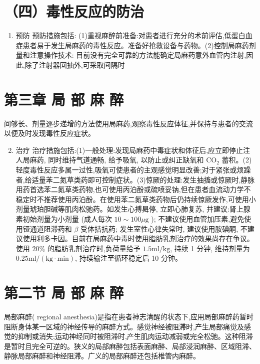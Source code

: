 \documentclass[10pt]{article}
\begin{document}
\section*{（四）毒性反应的防治}
\begin{enumerate}
  \item 预防 预防措施包括: (1)重视麻醉前准备:对患者进行充分的术前评估,低蛋白血症患者易于发生局麻药的毒性反应。准备好抢救设备与药物。(2)控制局麻药剂量和注意操作技术: 目前没有完全可靠的方法能确定局麻药意外血管内注射,因此,除了注射器回抽外,可采取间隔时
\end{enumerate}

\section*{第三章 局 部 麻 醉}
间够长、剂量逐步递增的方法使用局麻药,观察毒性反应体征,并保持与患者的交流以便及时发现毒性反应症状。

\begin{enumerate}
  \setcounter{enumi}{1}
  \item 治疗 治疗措施包括:(1)一般处理:发现局麻药中毒症状和体征后,应立即停止注人局麻药, 同时维持气道通畅, 给予吸氧, 以防止或纠正缺氧和 $\mathrm{CO}_{2}$ 蓄积。(2)轻度毒性反应多属一过性,吸氧可使患者的主观感觉明显改善;对于紧张或烦躁者,给适量苯二氮草类药即可控制症状。(3)惊厥的处理:发生抽搐或惊厥时,静脉用药首选苯二氮草类药物,也可使用丙泊酚或硫喷妥钠,但在患者血流动力学不稳定时不推荐使用丙泊酚。在使用苯二氮草类药物后仍持续惊厥发作,可使用小剂量琥珀胆碱等肌肉松驰药。如发生心搏曻停, 立即心肺复苏, 并建议:肾上腺素初始剂量为小剂量 (成人每次 $10 \sim 100 \mu \mathrm{g}$ ); 不建议使用血管加压素,避免使用铔通道阻滞药和 $\beta$ 受体拮抗药; 发生室性心律失常时, 建议使用胺碘酮, 不建议使用利多卡因。目前在局麻药中毒时使用脂肪乳剂治疗的效果尚存在争议。使用 $20 \%$ 的脂肪乳剂治疗时,负荷量给予 $1.5 \mathrm{ml} / \mathrm{kg}$, 持续 1 分钟, 维持剂量为 $0.25 \mathrm{ml} /(\mathrm{kg} \cdot \mathrm{min})$, 持续输注至循环稳定后 10 分钟。
\end{enumerate}

\section*{第二节 局 部 麻 醉}
局部麻醉( regional anesthesia)是指在患者神志清醒的状态下,应用局部麻醉药暂时阻断身体某一区域的神经传导的麻醉方式。感觉神经被阻滞时,产生局部痛觉及感觉的抑制或消失;运动神经同时被阻滞时,产生肌肉运动减弱或完全松驰。这种阻滞是暂时且完全可逆的。狭义的局部麻醉包括表面麻醉、局部浸润麻醉、区域阻滞、静脉局部麻醉和神经阻滞。广义的局部麻醉还包括椎管内麻醉。
\end{document}
